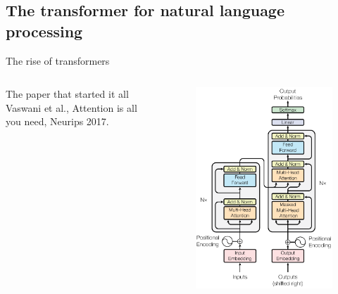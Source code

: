 \documentclass[xcolor=pdftex,dvipsnames,table,mathserif]{beamer}
\begin{document}
\subsection{The transformer for natural language processing}




\begin{frame}{The rise of transformers}

  \begin{columns}

    \begin{column}{.5\textwidth}
      \begin{block}{The paper that started it all}
        Vaswani et al., Attention is all you need, Neurips 2017.
      \end{block}
    \end{column}

    \begin{column}{.5\textwidth}
      \begin{figure}[ht]
        \centering
        \includegraphics[width=\textwidth]{transformer}
      \end{figure}
    \end{column}

  \end{columns}

\end{frame}
\end{document}
